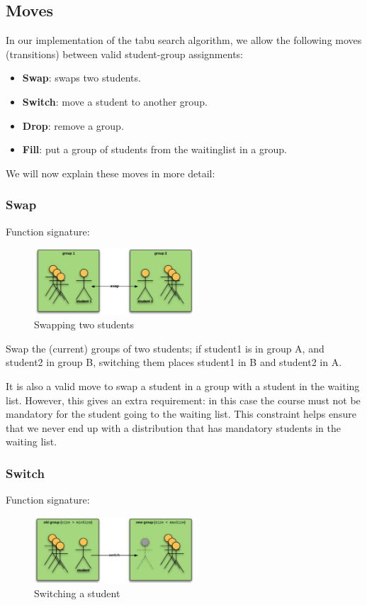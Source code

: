 \subsection{Moves}
\label{sec:moves}
In our implementation of the tabu search algorithm, we allow the following moves (transitions) between valid student-group assignments:
\begin{itemize}
	\item \textbf{Swap}: swaps two students.
	\item \textbf{Switch}: move a student to another group.
	\item \textbf{Drop}: remove a group.
	\item \textbf{Fill}: put a group of students from the waitinglist in a group.
\end{itemize}

We will now explain these moves in more detail:

\subsubsection{Swap}
Function signature:
\begin{figure}[H]
	\caption{Swapping two students}
	\label{fig:moves_swap}
	\centering
	\includegraphics[width=6cm]{img/swap}
\end{figure}

Swap the (current) groups of two students; if student1 is in group A, and student2 in group B, switching them places student1 in B and student2 in A.

It is also a valid move to swap a student in a group with a student in the waiting list. However, this gives an extra requirement: in this case the course must not be mandatory for the student going to the waiting list. This constraint helps ensure that we never end up with a distribution that has mandatory students in the waiting list.

\subsubsection{Switch}
Function signature:
\begin{figure}[H]
	\caption{Switching a student}
	\label{fig:moves_switch}
	\centering
	\includegraphics[width=6cm]{img/switch}
\end{figure}

